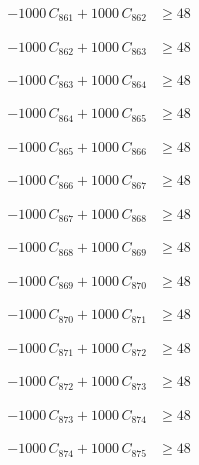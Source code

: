 \documentclass[a4paper,11pt]{article}
\begin{document}
\begin{align}
-1000\,C_{861} + 1000\,C_{862} &\geq 48 \nonumber
\end{align}

\begin{align}
-1000\,C_{862} + 1000\,C_{863} &\geq 48 \nonumber
\end{align}

\begin{align}
-1000\,C_{863} + 1000\,C_{864} &\geq 48 \nonumber
\end{align}

\begin{align}
-1000\,C_{864} + 1000\,C_{865} &\geq 48 \nonumber
\end{align}

\begin{align}
-1000\,C_{865} + 1000\,C_{866} &\geq 48 \nonumber
\end{align}

\begin{align}
-1000\,C_{866} + 1000\,C_{867} &\geq 48 \nonumber
\end{align}

\begin{align}
-1000\,C_{867} + 1000\,C_{868} &\geq 48 \nonumber
\end{align}

\begin{align}
-1000\,C_{868} + 1000\,C_{869} &\geq 48 \nonumber
\end{align}

\begin{align}
-1000\,C_{869} + 1000\,C_{870} &\geq 48 \nonumber
\end{align}

\begin{align}
-1000\,C_{870} + 1000\,C_{871} &\geq 48 \nonumber
\end{align}

\begin{align}
-1000\,C_{871} + 1000\,C_{872} &\geq 48 \nonumber
\end{align}

\begin{align}
-1000\,C_{872} + 1000\,C_{873} &\geq 48 \nonumber
\end{align}

\begin{align}
-1000\,C_{873} + 1000\,C_{874} &\geq 48 \nonumber
\end{align}

\begin{align}
-1000\,C_{874} + 1000\,C_{875} &\geq 48 \nonumber
\end{align}
\end{document}
